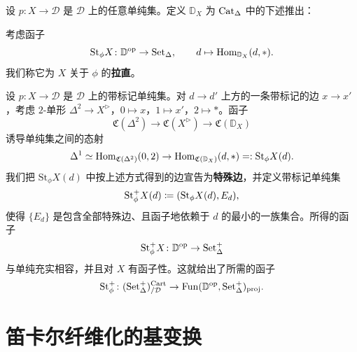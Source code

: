 \begin{construction}\label{L20-3.5}
设 $p\colon X\to\mathcal{D}$ 是 $\mathcal{D}$ 上的任意单纯集。定义 $\mathbb{D}_X$ 为 $\operatorname{Cat}_\Delta$ 中的下述推出：
\begin{center}
\end{center}
考虑函子
\[
\mathrm{St}_{\phi}X\colon\mathbb{D}^{\mathrm{op}}\to\operatorname{Set}_\Delta,\qquad d\mapsto\operatorname{Hom}_{\mathbb{D}_X}(d,\ast).
\]
我们称它为 $X$ 关于 $\phi$ 的\textbf{拉直}。
\end{construction}

\begin{construction}\label{L20-3.6}
设 $p\colon X\to\mathcal{D}$ 是 $\mathcal{D}$ 上的带标记单纯集。对 $d\to d'$ 上方的一条带标记的边 $x\to x'$，考虑 $2$-单形 $\Delta^2\to X^{\triangleright}$，$0\mapsto x$，$1\mapsto x'$，$2\mapsto\ast$。函子
\[
\mathfrak{C}(\Delta^2)\to\mathfrak{C}(X^{\triangleright})\to\mathfrak{C}(\mathbb{D}_X)
\]
诱导单纯集之间的态射
\[
\Delta^1\simeq\operatorname{Hom}_{\mathfrak{C}(\Delta^2)}(0,2)\to\operatorname{Hom}_{\mathfrak{C}(\mathbb{D}_X)}(d,\ast)\mathrel{=:}\mathrm{St}_{\phi}X(d).
\]
我们把 $\mathrm{St}_{\phi}X(d)$ 中按上述方式得到的边宣告为\textbf{特殊边}，并定义带标记单纯集
\[
\mathrm{St}^+_{\phi}X(d)\coloneqq(\mathrm{St}_{\phi}X(d),E_d),
\]
使得 $\{E_d\}$ 是包含全部特殊边、且函子地依赖于 $d$ 的最小的一族集合。所得的函子
\[
\mathrm{St}^+_{\phi}X\colon\mathbb{D}^{\mathrm{op}}\to\operatorname{Set}^+_\Delta
\]
与单纯充实相容，并且对 $X$ 有函子性。这就给出了所需的函子
\[
\mathrm{St}^+_{\phi}\colon(\operatorname{Set}^+_\Delta)^{\mathrm{Cart}}_{/\mathcal{D}}\to\operatorname{Fun}(\mathbb{D}^{\mathrm{op}},\operatorname{Set}^+_\Delta)_{\mathrm{proj}}.
\]
\end{construction}

\section{笛卡尔纤维化的基变换}

